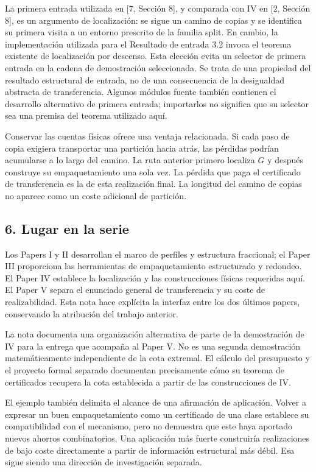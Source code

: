 \documentclass[spanish,11pt,a4paper]{article}
\begin{document}
La primera entrada utilizada en {[}7, Sección 8{]}, y comparada con IV
en {[}2, Sección 8{]}, es un argumento de localización: se sigue un
camino de copias y se identifica su primera visita a un entorno
prescrito de la familia split. En cambio, la implementación utilizada
para el Resultado de entrada 3.2 invoca el teorema existente de
localización por descenso. Esta elección evita un selector de primera
entrada en la cadena de demostración seleccionada. Se trata de una
propiedad del resultado estructural de entrada, no de una consecuencia
de la desigualdad abstracta de transferencia. Algunos módulos fuente
también contienen el desarrollo alternativo de primera entrada;
importarlos no significa que su selector sea una premisa del teorema
utilizado aquí.

Conservar las cuentas físicas ofrece una ventaja relacionada. Si cada
paso de copia exigiera transportar una partición hacia atrás, las
pérdidas podrían acumularse a lo largo del camino. La ruta anterior
primero localiza \(G\) y después construye su empaquetamiento una sola
vez. La pérdida que paga el certificado de transferencia es la de esta
realización final. La longitud del camino de copias no aparece como un
coste adicional de partición.

\subsection{6. Lugar en la serie}\label{lugar-en-la-serie}

Los Papers I y II desarrollan el marco de perfiles y estructura
fraccional; el Paper III proporciona las herramientas de empaquetamiento
estructurado y redondeo. El Paper IV establece la localización y las
construcciones físicas requeridas aquí. El Paper V separa el enunciado
general de transferencia y su coste de realizabilidad. Esta nota hace
explícita la interfaz entre los dos últimos papers, conservando la
atribución del trabajo anterior.

La nota documenta una organización alternativa de parte de la
demostración de IV para la entrega que acompaña al Paper V. No es una
segunda demostración matemáticamente independiente de la cota extremal.
El cálculo del presupuesto y el proyecto formal separado documentan
precisamente cómo su teorema de certificados recupera la cota
establecida a partir de las construcciones de IV.

El ejemplo también delimita el alcance de una afirmación de aplicación.
Volver a expresar un buen empaquetamiento como un certificado de una
clase establece su compatibilidad con el mecanismo, pero no demuestra
que este haya aportado nuevos ahorros combinatorios. Una aplicación más
fuerte construiría realizaciones de bajo coste directamente a partir de
información estructural más débil. Esa sigue siendo una dirección de
investigación separada.
\end{document}
